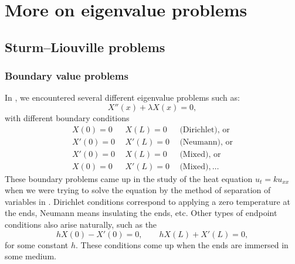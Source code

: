 \chapter{More on eigenvalue problems} \label{SL:chapter}


\section{Sturm--Liouville problems}
\label{slproblems:section}



\subsection{Boundary value problems}

In ,
we encountered several different eigenvalue problems such as:
\begin{equation*}
X''(x) + \lambda X(x) = 0 ,
\end{equation*}
with different boundary
conditions%
%
\begin{equation*}
\begin{array}{rrl}
X(0) = 0 & ~~X(L) = 0 & ~~\text{(Dirichlet), or} \\
X'(0) = 0 & ~~X'(L) = 0 & ~~\text{(Neumann), or} \\
X'(0) = 0 & ~~X(L) = 0 & ~~\text{(Mixed), or} \\
X(0) = 0 & ~~X'(L) = 0 & ~~\text{(Mixed)}, \ldots
\end{array}
\end{equation*}
These boundary problems came up in the study of the heat equation $u_t =
k u_{xx}$ when we were trying to solve the equation by the method of
separation of variables in .
Dirichlet conditions correspond to applying a
zero temperature at the ends, Neumann means insulating the ends, etc.
Other types of endpoint conditions also arise naturally, such as
the \emph{}
\begin{equation*}
hX(0) - X'(0) = 0, \qquad hX(L) + X'(L) = 0 ,
\end{equation*}
for some constant $h$.  These conditions come up when the ends are immersed
in some medium.

